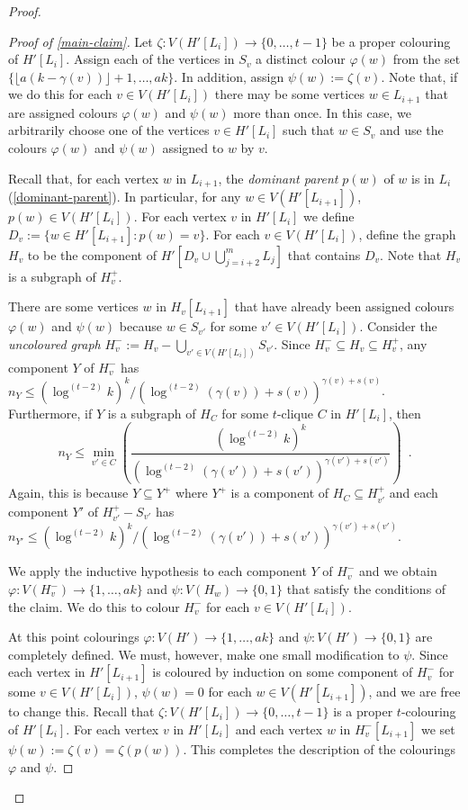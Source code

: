 \documentclass[kpfonts]{patmorin}
\theoremstyle{named}
\begin{document}
\begin{proof}
\begin{proof}[Proof of \cref{main-claim}]
       Let $\zeta:V(H'[L_i])\to\{0,\ldots,t-1\}$ be a proper colouring of $H'[L_i]$.  Assign each of the vertices in $S_v$ a distinct colour $\varphi(w)$ from the set $\{\lfloor a(k-\gamma(v))\rfloor+1,\ldots,ak\}$.  In addition, assign $\psi(w):=\zeta(v)$.  Note that, if we do this for each $v\in V(H'[L_i])$ there may be some vertices $w\in L_{i+1}$ that are assigned colours $\varphi(w)$ and $\psi(w)$ more than once.  In this case, we arbitrarily choose one of the vertices $v\in H'[L_i]$ such that $w\in S_v$ and use the colours $\varphi(w)$ and $\psi(w)$ assigned to $w$ by $v$.

       Recall that, for each vertex $w$ in $L_{i+1}$, the \emph{dominant parent} $p(w)$ of $w$ is in $L_i$ (\cref{dominant-parent}).  In particular, for any $w\in V(H'[L_{i+1}])$, $p(w)\in V(H'[L_{i}])$.
       For each vertex $v$ in $H'[L_i]$ we define $D_v:=\{w\in H'[L_{i+1}]: p(w)=v\}$.  For each $v\in V(H'[L_i])$, define the graph $H_v$ to be the component of $H'[D_v\cup \bigcup_{j=i+2}^m L_j]$ that contains $D_v$.  Note that $H_v$ is a subgraph of $H^+_v$.

       There are some vertices $w$ in $H_v[L_{i+1}]$ that have already been assigned colours $\varphi(w)$ and $\psi(w)$ because $w\in S_{v'}$ for some $v'\in V(H'[L_i])$.  Consider the \emph{uncoloured graph} $H^-_v:=H_v-\bigcup_{v'\in V(H'[L_i])} S_{v'}$.  Since $H^-_v\subseteq H_v\subseteq H^+_v$, any component $Y$ of $H^-_v$ has $n_Y\le (\log^{(t-2)} k)^k/(\log^{(t-2)} (\gamma(v))+s(v))^{\gamma(v)+s(v)}$.  Furthermore, if $Y$ is a subgraph of $H_C$ for some $t$-clique $C$ in $H'[L_i]$, then
       \begin{equation}
        n_Y \le \min_{v'\in C}\left(\frac{(\log^{(t-2)}k)^k}{(\log^{(t-2)} (\gamma(v'))+s(v'))^{\gamma(v')+s(v')}} \right) \enspace . \label{min}
        \end{equation}
       Again, this is because $Y\subseteq Y^+$ where $Y^+$ is a component of $H_C\subseteq H^+_{v'}$ and each component $Y'$ of $H^+_{v'}-S_{v'}$ has $n_{Y'}\le (\log^{(t-2)}k)^k/(\log^{(t-2)} (\gamma(v'))+s(v'))^{\gamma(v')+s(v')}$.

       We apply the inductive hypothesis to each component $Y$ of $H^-_v$ and we obtain $\varphi:V(H^-_v)\to\{1,\ldots,ak\}$ and $\psi:V(H_w)\to\{0,1\}$ that satisfy the conditions of the claim.  We do this to colour $H^-_v$ for each $v\in V(H'[L_i])$.

       At this point colourings $\varphi:V(H')\to\{1,\ldots,ak\}$ and $\psi:V(H')\to\{0,1\}$ are completely defined.  We must, however, make one small modification to $\psi$.  Since each vertex in $H'[L_{i+1}]$ is coloured by induction on some component of $H^-_v$ for some $v\in V(H'[L_i])$, $\psi(w)=0$ for each $w\in V(H'[L_{i+1}])$, and we are free to change this.
       Recall that $\zeta:V(H'[L_i])\to\{0,\ldots,t-1\}$ is a proper $t$-colouring of $H'[L_i]$.  For each vertex $v$ in $H'[L_i]$ and each vertex $w$ in $H^-_v[L_{i+1}]$ we set $\psi(w):=\zeta(v)=\zeta(p(w))$.  This completes the description of the colourings $\varphi$ and $\psi$.


\end{proof}
\end{proof}
\end{document}
